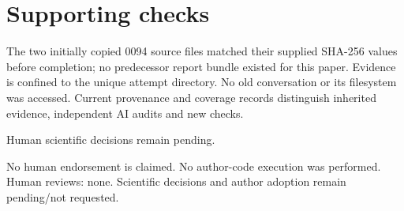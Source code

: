 \documentclass[10pt]{article}
\begin{document}
\section*{Supporting checks}
The two initially copied 0094 source files matched their supplied SHA-256 values before completion; no predecessor report bundle existed for this paper. Evidence is confined to the unique attempt directory. No old conversation or its filesystem was accessed. Current provenance and coverage records distinguish inherited evidence, independent AI audits and new checks.\par
Human scientific decisions remain pending.\par
No human endorsement is claimed. No author-code execution was performed. Human reviews: none. Scientific decisions and author adoption remain pending/not requested.\par
\end{document}
